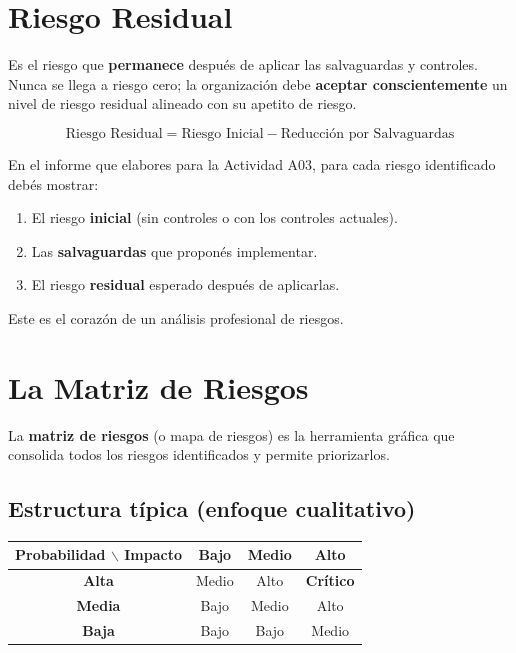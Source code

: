 \documentclass[11pt,a4paper]{article}
\begin{document}
\section{Riesgo Residual}

\begin{definicion}
Es el riesgo que \textbf{permanece} después de aplicar las salvaguardas y controles. Nunca se llega a riesgo cero; la organización debe \textbf{aceptar conscientemente} un nivel de riesgo residual alineado con su apetito de riesgo.
\end{definicion}

\[
\text{Riesgo Residual} = \text{Riesgo Inicial} - \text{Reducción por Salvaguardas}
\]

\begin{alerta}
En el informe que elabores para la Actividad A03, para cada riesgo identificado debés mostrar:
\begin{enumerate}
  \item El riesgo \textbf{inicial} (sin controles o con los controles actuales).
  \item Las \textbf{salvaguardas} que proponés implementar.
  \item El riesgo \textbf{residual} esperado después de aplicarlas.
\end{enumerate}
Este es el corazón de un análisis profesional de riesgos.
\end{alerta}

\section{La Matriz de Riesgos}
La \textbf{matriz de riesgos} (o mapa de riesgos) es la herramienta gráfica que consolida todos los riesgos identificados y permite priorizarlos.

\subsection{Estructura típica (enfoque cualitativo)}

\begin{center}
\renewcommand{\arraystretch}{1.35}
\begin{tabular}{@{} c | c c c @{}}
\toprule
\textbf{Probabilidad $\backslash$ Impacto} & \textbf{Bajo} & \textbf{Medio} & \textbf{Alto} \\
\midrule
\textbf{Alta}   & Medio  & Alto   & \textbf{Crítico} \\
\textbf{Media}  & Bajo   & Medio  & Alto \\
\textbf{Baja}   & Bajo   & Bajo   & Medio \\
\bottomrule
\end{tabular}
\end{center}
\end{document}
